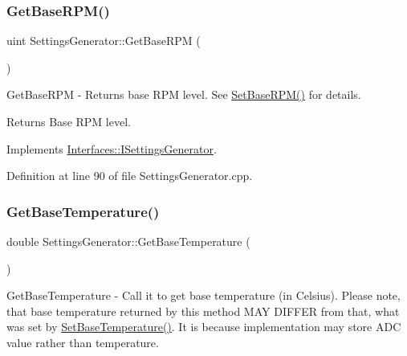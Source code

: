 \subsubsection{\texorpdfstring{Get\+Base\+R\+P\+M()}{GetBaseRPM()}}
{\footnotesize\ttfamily uint Settings\+Generator\+::\+Get\+Base\+R\+PM (\begin{DoxyParamCaption}{ }\end{DoxyParamCaption})\hspace{0.3cm}{\ttfamily [virtual]}}



Get\+Base\+R\+PM -\/ Returns base R\+PM level. See \hyperlink{class_settings_generator_a1c1960b9021f7081b4c42c4d7c0eda34}{Set\+Base\+R\+P\+M()} for details. 

\begin{DoxyReturn}{Returns}
Base R\+PM level. 
\end{DoxyReturn}


Implements \hyperlink{class_interfaces_1_1_i_settings_generator_ad088253da57b2ee0b94fe6fd1fb2dfdd}{Interfaces\+::\+I\+Settings\+Generator}.



Definition at line 90 of file Settings\+Generator.\+cpp.

\mbox{\label{class_settings_generator_a80b1ff8060a16d149989d98a88ab253e}} 
\subsubsection{\texorpdfstring{Get\+Base\+Temperature()}{GetBaseTemperature()}}
{\footnotesize\ttfamily double Settings\+Generator\+::\+Get\+Base\+Temperature (\begin{DoxyParamCaption}{ }\end{DoxyParamCaption})\hspace{0.3cm}{\ttfamily [virtual]}}



Get\+Base\+Temperature -\/ Call it to get base temperature (in Celsius). Please note, that base temperature returned by this method M\+AY D\+I\+F\+F\+ER from that, what was set by \hyperlink{class_settings_generator_aed9e7acb30bfd559b1ac70ceeddd8973}{Set\+Base\+Temperature()}. It is because implementation may store A\+DC value rather than temperature. 

